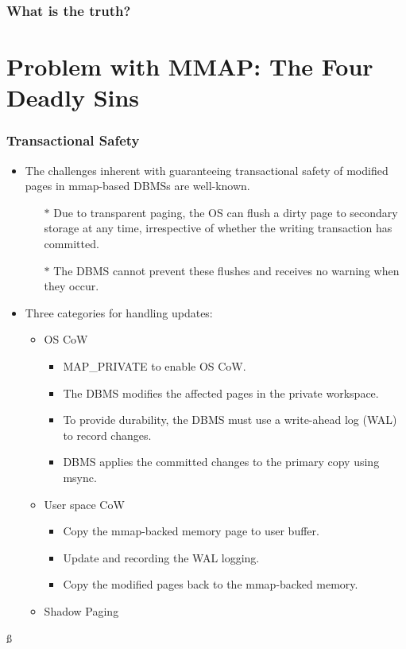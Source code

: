 \documentclass[10pt,svgnames,fragile]{beamer}
\begin{document}
\begin{frame}
	\frametitle{What is the truth?}
	\begin{center}
		\fontsize{20pt}{\baselineskip}
	\end{center}
	
\end{frame}

\section{Problem with MMAP: The Four Deadly Sins}
\begin{frame}
	\frametitle{Transactional Safety}
	\begin{itemize}
		\item The challenges inherent with guaranteeing transactional safety of modified pages in mmap-based DBMSs are well-known.
		\begin{itemize}
			\item[$\ast$] Due to transparent paging, {\color{red}the OS can flush a dirty page} to secondary storage {\color{red}at any time}, irrespective of whether the writing transaction has committed. 
			\item[$\ast$] The DBMS cannot prevent these flushes and receives {\color{red}no warning} when they occur.
		\end{itemize}
	\end{itemize}
	\begin{itemize}
		\item Three categories for handling updates:
		\begin{itemize}
			\item<1->[$\ast$] OS CoW
			\begin{itemize}
				\item<2->[\checkmark] MAP\_PRIVATE to enable OS CoW.
				\item<3->[\checkmark]The DBMS modifies the affected pages in the private workspace.
				\item<4->[\checkmark] To provide durability, the DBMS must use a write-ahead log (WAL) to record changes.
				\item<5->[\checkmark] DBMS applies the committed changes to the primary copy using msync.
			\end{itemize}
			\item<6->[$\ast$]  User space CoW
			\begin{itemize}
				\item<7->[\checkmark] Copy the mmap-backed memory page to user buffer.
				\item<8->[\checkmark] Update and recording the WAL logging.
				\item<9->[\checkmark] Copy the modified pages back to the mmap-backed memory.
			\end{itemize}
			\item<10->[$\ast$]  Shadow Paging
		\end{itemize}
	\end{itemize}ß
\end{frame}
\end{document}
